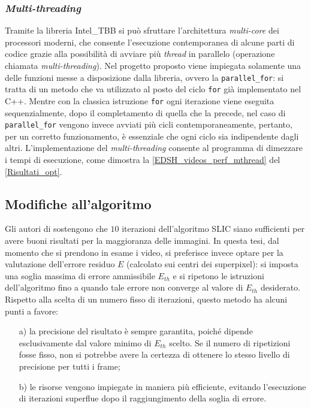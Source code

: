 \documentclass[12pt,a4paper,oneside]{article}
\begin{document}
\subsubsection{\textit{Multi-threading}}
Tramite la libreria \gls{Intel_TBB} si può sfruttare l'architettura \textit{multi-core} dei processori moderni, che consente l'esecuzione contemporanea di alcune parti di codice grazie alla possibilità di avviare più \textit{thread} in parallelo (operazione chiamata \textit{multi-threading}). Nel progetto proposto viene impiegata solamente una delle funzioni messe a disposizione dalla libreria, ovvero la \texttt{parallel\_for}: si tratta di un metodo che va utilizzato al posto del ciclo \texttt{for} già implementato nel \mbox{C++}. Mentre con la classica istruzione \texttt{for} ogni iterazione viene eseguita sequenzialmente, dopo il completamento di quella che la precede, nel caso di \texttt{parallel\_for} vengono invece avviati più cicli contemporaneamente, pertanto, per un corretto funzionamento, è essenziale che ogni ciclo sia indipendente dagli altri. L'implementazione del \textit{multi-threading} consente al programma di dimezzare i tempi di esecuzione, come dimostra la \cref{EDSH_videos_perf_mthread} del \cref{Risultati_opt}.

\subsection{Modifiche all'algoritmo}\label{Modifiche_algoritmo}
Gli autori di \cite{ACHANTA_SLIC} sostengono che $10$ iterazioni dell'algoritmo \gls{SLIC} siano sufficienti per avere buoni risultati per la maggioranza delle immagini. In questa tesi, dal momento che si prendono in esame i video, si preferisce invece optare per la valutazione dell'errore residuo $E$ (calcolato sui centri dei superpixel): si imposta una soglia massima di errore ammissibile $E_{th}$ e si ripetono le istruzioni dell'algoritmo fino a quando tale errore non converge al valore di $E_{th}$ desiderato. Rispetto alla scelta di un numero fisso di iterazioni, questo metodo ha alcuni punti a favore:
\begin{enumerate}
	\item[a)]la precisione del risultato è sempre garantita, poiché dipende esclusivamente dal valore minimo di $E_{th}$ scelto. Se il numero di ripetizioni fosse fisso, non si potrebbe avere la certezza di ottenere lo stesso livello di precisione per tutti i frame;
	\item[b)]le risorse vengono impiegate in maniera più efficiente, evitando l'esecuzione di iterazioni superflue dopo il raggiungimento della soglia di errore.
\end{enumerate}
\end{document}

